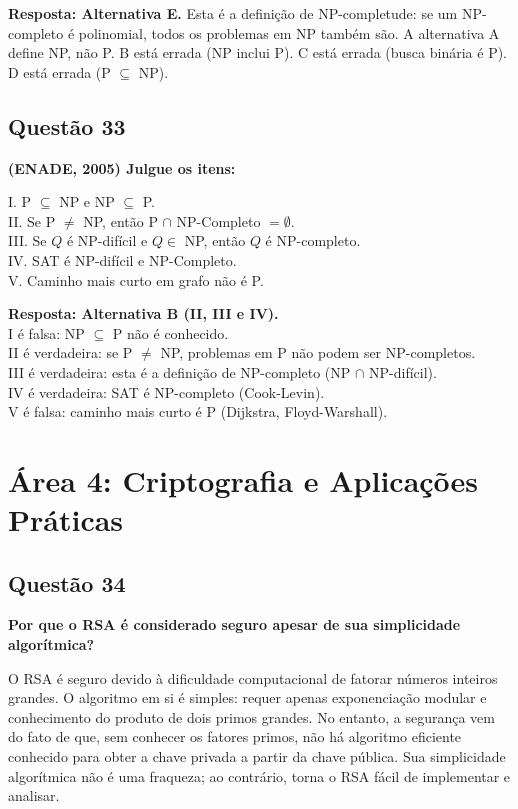 \documentclass[conference]{IEEEtran}
\begin{document}
\textbf{Resposta: Alternativa E.} Esta é a definição de NP-completude: se um NP-completo é polinomial, todos os problemas em NP também são. A alternativa A define NP, não P. B está errada (NP inclui P). C está errada (busca binária é P). D está errada (P $\subseteq$ NP).

\subsection{Questão 33}
\textbf{(ENADE, 2005) Julgue os itens:}

I. P $\subseteq$ NP e NP $\subseteq$ P. \\
II. Se P $\neq$ NP, então P $\cap$ NP-Completo $= \emptyset$. \\
III. Se $Q$ é NP-difícil e $Q \in$ NP, então $Q$ é NP-completo. \\
IV. SAT é NP-difícil e NP-Completo. \\
V. Caminho mais curto em grafo não é P.

\textbf{Resposta: Alternativa B (II, III e IV).} \\
I é falsa: NP $\subseteq$ P não é conhecido. \\
II é verdadeira: se P $\neq$ NP, problemas em P não podem ser NP-completos. \\
III é verdadeira: esta é a definição de NP-completo (NP $\cap$ NP-difícil). \\
IV é verdadeira: SAT é NP-completo (Cook-Levin). \\
V é falsa: caminho mais curto é P (Dijkstra, Floyd-Warshall).

\section{Área 4: Criptografia e Aplicações Práticas}

\subsection{Questão 34}
\textbf{Por que o RSA é considerado seguro apesar de sua simplicidade algorítmica?}

O RSA é seguro devido à dificuldade computacional de fatorar números inteiros grandes. O algoritmo em si é simples: requer apenas exponenciação modular e conhecimento do produto de dois primos grandes. No entanto, a segurança vem do fato de que, sem conhecer os fatores primos, não há algoritmo eficiente conhecido para obter a chave privada a partir da chave pública. Sua simplicidade algorítmica não é uma fraqueza; ao contrário, torna o RSA fácil de implementar e analisar.
\end{document}

